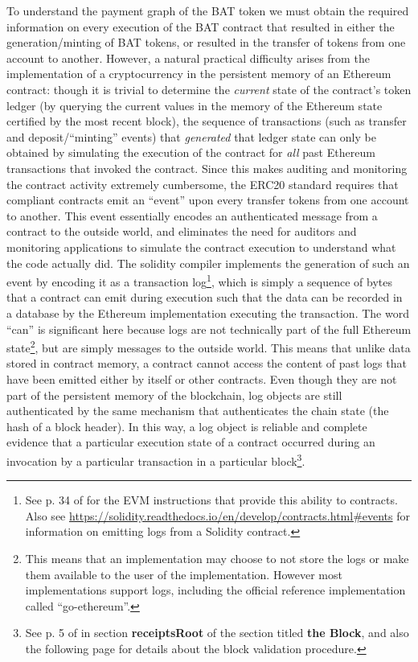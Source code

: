 \documentclass[sigconf]{acmart}
\begin{document}
To understand the payment graph of the BAT token
we must obtain the required information on
every execution of the BAT contract that resulted in
either the generation/minting of BAT tokens,
or resulted in the transfer of tokens from one account to another.
However, a natural practical difficulty arises from the implementation
of a cryptocurrency in the persistent memory of an
Ethereum contract: though it is trivial to determine
the \emph{current} state of the contract's token ledger 
(by querying the current values in the memory
of the Ethereum state certified by the most recent block), the
sequence of transactions (such as transfer and
deposit/``minting'' events) that \emph{generated} that
ledger state can only be obtained by simulating
the execution of the contract for \emph{all} past Ethereum
transactions that invoked the contract.
Since this makes auditing and monitoring the contract
activity extremely cumbersome, the ERC20
standard requires that compliant contracts
emit an ``event'' upon every transfer tokens
from one account to another.
This event essentially encodes an authenticated
message from a contract to the outside world,
and eliminates the need for auditors and
monitoring applications to simulate the contract
execution to understand what the code actually
did. The solidity compiler implements the generation of
such an event by encoding it as a transaction
log\footnote{See p. 34 of \cite{yellowpaper} for the EVM instructions that provide this ability to contracts.
Also see \url{https://solidity.readthedocs.io/en/develop/contracts.html\#events} for information
on emitting logs from a Solidity contract.},
which is simply a sequence of bytes that a contract
can emit during execution such that the data
can be recorded in a database by the
Ethereum implementation executing the
transaction. The word ``can'' is
significant here because logs are not technically
part of the full Ethereum
state\footnote{This means that an implementation
may choose to not store the logs or make them
available to the user of the implementation.
However most implementations support logs,
including the official
reference implementation called ``go-ethereum''.}, but are
simply messages to the outside world.
This means that unlike data stored in contract memory,
a contract cannot
access the content of past logs that have been emitted
either by itself or other contracts.
Even though they are not part of the persistent
memory of the blockchain,
log objects are still authenticated by the
same mechanism that authenticates the chain state
(the hash of a block header).
In this way, a log object
is reliable and complete evidence
that a particular execution state of a contract
occurred during an invocation by a particular
transaction in a particular
block\footnote{See p. 5 of \cite{yellowpaper}
in section \textbf{receiptsRoot}
of the section titled \textbf{the Block},
and also the following page for
details about the block validation procedure.}.
\end{document}
